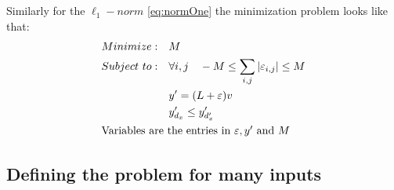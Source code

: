 \documentclass[a4paper]{llncs}
\begin{document}
\\\\
Similarly for the $\ell_1-norm$ \ref{eq:normOne} the minimization problem looks like that:
\begin{equation}
\label{eq:NotLP}
\begin{split}
    Minimize:\quad & M \\
    Subject\ to:\quad & \forall i,j\quad -M \leq\sum_{i,j}\left\lvert\varepsilon_{i,j}\right\rvert\leq M \\
    & y'=(L+\varepsilon)v \\
    & y'_{d_x} \leq y'_{d'_x} \\
	\intertext{Variables are the entries in $\varepsilon,y'$ and $M$}
\end{split}
\end{equation}
\subsection{Defining the problem for many inputs}
\label{sec:defineProblem2}
\end{document}
